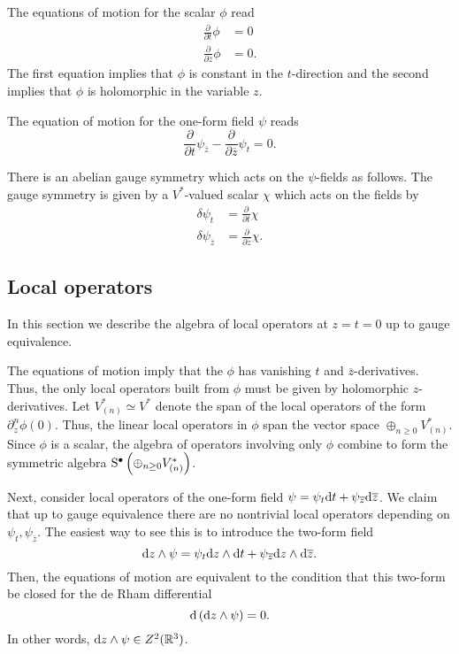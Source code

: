 \documentclass[11pt]{amsart}
\def\zbar{{\overline{z}}}
\begin{document}
The equations of motion for the scalar $\phi$ read
\begin{align*}
\frac{\partial}{\partial t} \phi & = 0 \\
\frac{\partial}{\partial \zbar} \phi & = 0 .
\end{align*}
The first equation implies that $\phi$ is constant in the $t$-direction and the second implies that $\phi$ is holomorphic in the variable $z$. 

The equation of motion for the one-form field $\psi$ reads
\[
\frac{\partial}{\partial t} \psi_\zbar - \frac{\partial}{\partial \zbar} \psi_t = 0 .
\]

There is an abelian gauge symmetry which acts on the $\psi$-fields as follows.
The gauge symmetry is given by a $V^*$-valued scalar $\chi$ which acts on the fields by
\begin{align*}
\delta \psi_t & = \frac{\partial}{\partial t} \chi \\
\delta \psi_\zbar & = \frac{\partial}{\partial \zbar} \chi .
\end{align*}

\subsection*{Local operators}

In this section we describe the algebra of local operators at $z = t = 0$ up to gauge equivalence.

The equations of motion imply that the $\phi$ has vanishing $t$ and $\zbar$-derivatives. 
Thus, the only local operators built from $\phi$ must be given by holomorphic $z$-derivatives. 
Let $V^*_{(n)} \simeq V^*$ denote the span of the local operators of the form $\partial_z^n \phi(0)$.
Thus, the linear local operators in $\phi$ span the vector space $\oplus_{n \geq 0} V_{(n)}^*$.
Since $\phi$ is a scalar, the algebra of operators involving only $\phi$ combine to form the symmetric algebra ${\rm S}^\bullet \left(\oplus_{n \geq 0} V^*_{(n)}\right)$.

Next, consider local operators of the one-form field $\psi = \psi_t \d t + \psi_\zbar \d \zbar$. 
We claim that up to gauge equivalence there are no nontrivial local operators depending on $\psi_t, \psi_\zbar$.  
The easiest way to see this is to introduce the two-form field
\[
\d z \wedge \psi = \psi_t \d z \wedge \d t + \psi_\zbar \d z \wedge \d \zbar .
\]
Then, the equations of motion are equivalent to the condition that this two-form be closed for the de Rham differential
\[
{\rm d} \left({\rm d} z \wedge \psi\right) = 0 .
\]
In other words, ${\rm d} z \wedge \psi \in Z^2 (\mathbb R^3)$. 
\end{document}
